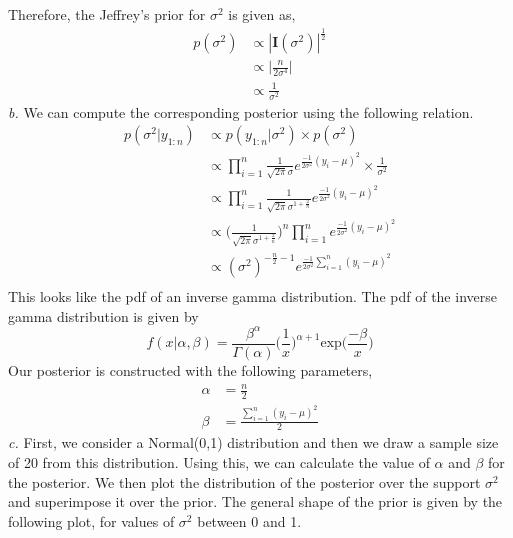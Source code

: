 \documentclass[11pt]{article}
\begin{document}
Therefore, the Jeffrey's prior for $\sigma^{2}$ is given as,
\begin{equation}
  \nonumber
  \begin{aligned}
    p(\sigma^{2}) & \propto |\mathbf{I}(\sigma^{2})|^{\frac{1}{2}}\\
    & \propto \bigg|\frac{n}{2\sigma^{4}}\bigg|\\
    & \propto \frac{1}{\sigma^{2}}
  \end{aligned}
\end{equation}
\emph{b.} We can compute the corresponding posterior using the following relation.
\begin{equation}
  \nonumber
  \begin{aligned}
    p(\sigma^{2} | y_{1:n}) & \propto p(y_{1:n} | \sigma^{2}) \times p(\sigma^{2})\\
    & \propto \prod_{i = 1}^{n} \frac{1}{\sqrt{2\pi}\sigma}e^{\frac{-1}{2\sigma^{2}} (y_{i} - \mu)^{2}} \times \frac{1}{\sigma^{2}}\\
    & \propto \prod_{i = 1}^{n} \frac{1}{\sqrt{2\pi}\sigma^{1 + \frac{2}{n}}}e^{\frac{-1}{2\sigma^{2}} (y_{i} - \mu)^{2}}\\
    & \propto \bigg(\frac{1}{\sqrt{2\pi}\sigma^{1 + \frac{2}{n}}}\bigg)^{n} \prod_{i = 1}^{n}e^{\frac{-1}{2\sigma^{2}} (y_{i} - \mu)^{2}}\\
    & \propto (\sigma^{2})^{-\frac{n}{2} - 1}e^{\frac{-1}{2\sigma^{2}} \sum_{i = 1}^{n} (y_{i} - \mu)^{2}}\\
  \end{aligned}
\end{equation}
This looks like the pdf of an inverse gamma distribution. The pdf of the inverse gamma distribution is given by
\begin{equation}
  \nonumber
  f(x | \alpha, \beta) = \frac{\beta^{\alpha}}{\Gamma(\alpha)}\bigg(\frac{1}{x}\bigg)^{\alpha+1}\text{exp}\bigg(\frac{-\beta}{x}\bigg)
\end{equation}
Our posterior is constructed with the following parameters,
\begin{equation}
  \nonumber
  \begin{aligned}
    \alpha & = \frac{n}{2}\\
    \beta & = \frac{\sum_{i = 1}^{n} (y_{i} - \mu)^{2}}{2}
  \end{aligned}
\end{equation}
\emph{c.}
First, we consider a Normal(0,1) distribution and then we draw a sample size of 20 from this distribution. Using this, we can calculate the value of $\alpha$ and $\beta$ for the posterior. We then plot the distribution of the posterior over the support $\sigma^{2}$ and superimpose it over the prior. The general shape of the prior is given by the following plot, for values of $\sigma^{2}$ between 0 and 1.
\end{document}
